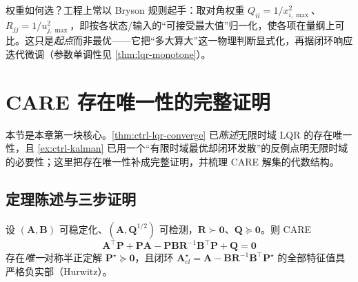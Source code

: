 \begin{remark}
权重如何选？工程上常以 Bryson 规则起手：取对角权重 $Q_{ii}=1/x_{i,\max}^2$、$R_{jj}=1/u_{j,\max}^2$，即按各状态/输入的“可接受最大值”归一化，使各项在量纲上可比。这只是\emph{起点}而非最优——它把“多大算大”这一物理判断显式化，再据闭环响应迭代微调（参数单调性见 \cref{thm:lqr-monotone}）。
\end{remark}

\section{CARE 存在唯一性的完整证明}
\label{sec:lqr-existence}

本节是本章第一块核心。\cref{thm:ctrl-lqr-converge} 已\emph{陈述}无限时域 LQR 的存在唯一性，且 \cref{ex:ctrl-kalman} 已用一个“有限时域最优却闭环发散”的反例点明无限时域的必要性；这里把存在唯一性补成完整证明，并梳理 CARE 解集的代数结构。

\subsection{定理陈述与三步证明}
\label{sec:lqr-care-exist}

\begin{theorem}\label{thm:lqr-care-exist}
设 $(\mathbf A,\mathbf B)$ 可稳定化、$(\mathbf A,\mathbf Q^{1/2})$ 可检测，$\mathbf R\succ\mathbf0$、$\mathbf Q\succeq\mathbf0$。则 CARE
\begin{equation}
  \mathbf A^\top\mathbf P+\mathbf P\mathbf A-\mathbf P\mathbf B\mathbf R^{-1}\mathbf B^\top\mathbf P+\mathbf Q=\mathbf0
  \label{eq:lqr-care}
\end{equation}
存在\emph{唯一}对称半正定解 $\mathbf P^\star\succeq\mathbf0$，且闭环 $\mathbf A_{cl}^\star=\mathbf A-\mathbf B\mathbf R^{-1}\mathbf B^\top\mathbf P^\star$ 的全部特征值具严格负实部（Hurwitz）。
\end{theorem}

